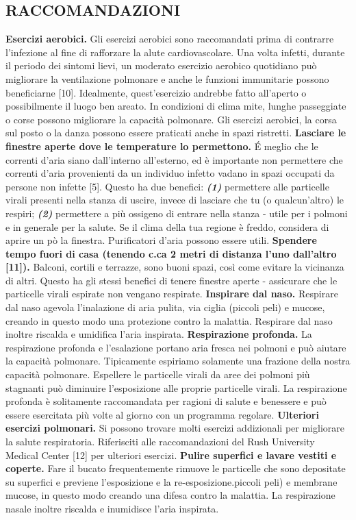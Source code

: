 \documentclass[onecolumn,journal]{IEEEtran}
\begin{document}
\begin{multicols}{2}
\section*{RACCOMANDAZIONI}
\textbf{Esercizi aerobici.} Gli esercizi aerobici sono raccomandati prima di contrarre l'infezione al fine di rafforzare la alute cardiovascolare. Una volta infetti, durante il periodo dei sintomi lievi, un moderato esercizio aerobico quotidiano può migliorare la ventilazione polmonare e anche le funzioni immunitarie possono beneficiarne [10]. Idealmente, quest'esercizio andrebbe fatto all'aperto o possibilmente il luogo ben areato. In condizioni di clima mite, lunghe passeggiate o corse possono migliorare la capacità polmonare. Gli esercizi aerobici, la corsa sul posto o la danza possono essere praticati anche in spazi ristretti.
\textbf{Lasciare le finestre aperte dove le temperature lo permettono.} É meglio che le correnti d’aria siano dall’interno all’esterno, ed è importante non permettere che correnti d’aria provenienti da un individuo infetto vadano in spazi occupati da persone non infette [5]. Questo ha due benefici: \textbf{\textit{(1)}} permettere alle particelle virali presenti nella stanza di uscire, invece di lasciare che tu (o qualcun’altro) le respiri; \textbf{\textit{(2)}} permettere a più ossigeno di entrare nella stanza - utile per i polmoni e in generale per la salute. Se il clima della tua regione è freddo, considera di aprire un pò la finestra. Purificatori d’aria possono essere utili.
\textbf{Spendere tempo fuori di casa (tenendo c.ca 2 metri di distanza l'uno dall'altro [11]).} Balconi, cortili e terrazze, sono buoni spazi, così come evitare la vicinanza di altri. Questo ha gli stessi benefici di tenere finestre aperte - assicurare che le particelle virali espirate non vengano respirate.
\textbf{Inspirare dal naso.} Respirare dal naso agevola l’inalazione di aria pulita, via ciglia (piccoli peli) e mucose, creando in questo modo una protezione contro la malattia. Respirare dal naso inoltre riscalda e umidifica l'aria inspirata.
\textbf{Respirazione profonda.} La respirazione profonda e l’esalazione portano aria fresca nei polmoni e può aiutare la capacità polmonare. Tipicamente espiriamo solamente una frazione della nostra capacità polmonare. Espellere le particelle virali da aree dei polmoni più stagnanti può diminuire l’esposizione alle proprie particelle virali. La respirazione profonda è solitamente raccomandata per ragioni di salute e benessere e può essere esercitata più volte al giorno con un programma regolare.
\textbf{Ulteriori esercizi polmonari.} Si possono trovare molti esercizi addizionali per migliorare la salute respiratoria. Riferisciti alle raccomandazioni del Rush University Medical Center [12] per ulteriori esercizi.
\textbf{Pulire superfici e lavare vestiti e coperte.} Fare il bucato frequentemente rimuove le particelle che sono depositate su superfici e previene l’esposizione e la re-esposizione.piccoli peli) e membrane mucose, in questo modo creando una difesa contro la malattia. La respirazione nasale inoltre riscalda e inumidisce l’aria inspirata.


\end{multicols}
\end{document}
